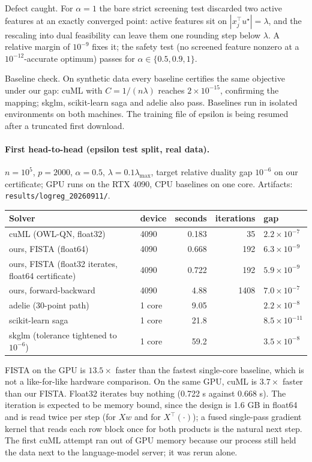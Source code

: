 Defect caught. For $\alpha=1$ the bare strict screening test discarded two
active features at an exactly converged point: active features sit on
$|x_j^\top u^\star| = \lambda$, and the rescaling into dual feasibility can leave
them one rounding step below $\lambda$. A relative margin of $10^{-9}$ fixes it;
the safety test (no screened feature nonzero at a $10^{-12}$-accurate optimum)
passes for $\alpha \in \{0.5, 0.9, 1\}$.

Baseline check. On synthetic data every baseline certifies the same
objective under our gap: cuML with $C = 1/(n\lambda)$ reaches $2\times10^{-15}$,
confirming the mapping; skglm, scikit-learn saga and adelie also pass.
Baselines run in isolated environments on both machines. The training file
of epsilon is being resumed after a truncated first download.

\paragraph{First head-to-head (epsilon test split, real data).}
$n=10^5$, $p=2000$, $\alpha=0.5$, $\lambda=0.1\lambda_{\max}$, target relative duality
gap $10^{-6}$ on our certificate; GPU runs on the RTX 4090, CPU baselines on
one core. Artifacts: \texttt{results/logreg\_20260911/}.

\begin{center}
\small
\begin{tabular}{llrrl}
\toprule
Solver & device & seconds & iterations & gap \\
\midrule
cuML (OWL-QN, float32) & 4090 & 0.183 & 35 & $2.2\times10^{-7}$ \\
ours, FISTA (float64) & 4090 & 0.668 & 192 & $6.3\times10^{-9}$ \\
ours, FISTA (float32 iterates, float64 certificate) & 4090 & 0.722 & 192 & $5.9\times10^{-9}$ \\
ours, forward-backward & 4090 & 4.88 & 1408 & $7.0\times10^{-7}$ \\
adelie (30-point path) & 1 core & 9.05 & & $2.2\times10^{-8}$ \\
scikit-learn saga & 1 core & 21.8 & & $8.5\times10^{-11}$ \\
skglm (tolerance tightened to $10^{-6}$) & 1 core & 59.2 & & $3.5\times10^{-8}$ \\
\bottomrule
\end{tabular}
\end{center}

FISTA on the GPU is $13.5\times$ faster than the fastest single-core baseline,
which is not a like-for-like hardware comparison. On the same GPU, cuML is
$3.7\times$ faster than our FISTA. Float32 iterates buy nothing (0.722 s against
0.668 s). The iteration is expected to be memory bound, since the design is
1.6 GB in float64 and is read twice per step (for $Xw$ and for $X^\top(\cdot)$);
a fused single-pass gradient kernel that reads each row block once for both
products is the natural next step. The first cuML attempt ran out of GPU
memory because our process still held the data next to the language-model
server; it was rerun alone.

